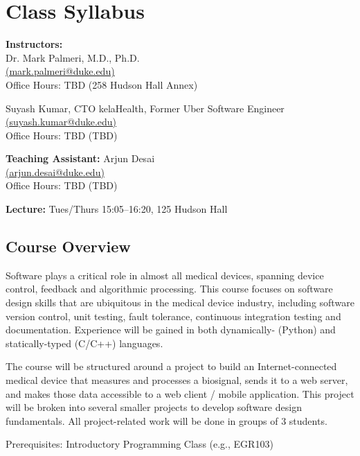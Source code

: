 



\section*{Class Syllabus}

{\bf Instructors:}\\
Dr. Mark Palmeri, M.D., Ph.D.\\
\href{mailto:mark.palmeri@duke.edu}{(mark.palmeri@duke.edu)}\\
Office Hours: TBD (258 Hudson Hall Annex)

Suyash Kumar, CTO kelaHealth, Former Uber Software Engineer\\
\href{mailto:suyash.kumar@duke.edu}{(suyash.kumar@duke.edu)}\\
Office Hours: TBD (TBD)

{\bf Teaching Assistant:}
Arjun Desai\\
\href{mailto:arjun.desai@duke.edu}{(arjun.desai@duke.edu)}\\
Office Hours: TBD (TBD)

{\bf Lecture:} Tues/Thurs 15:05--16:20, 125 Hudson Hall

\subsection*{Course Overview}
Software plays a critical role in almost all medical devices, spanning device control, feedback and algorithmic processing.  This course focuses on software design skills that are ubiquitous in the medical device industry, including software version control, unit testing, fault tolerance, continuous integration testing and documentation.  Experience will be gained in both dynamically- (Python) and statically-typed (C/C++) languages. 

The course will be structured around a project to build an Internet-connected medical device that measures and processes a biosignal, sends it to a web server, and makes those data accessible to a web client / mobile application.  This project will be broken into several smaller projects to develop software design fundamentals.  All project-related work will be done in groups of 3 students.

Prerequisites: Introductory Programming Class (e.g., EGR103)

